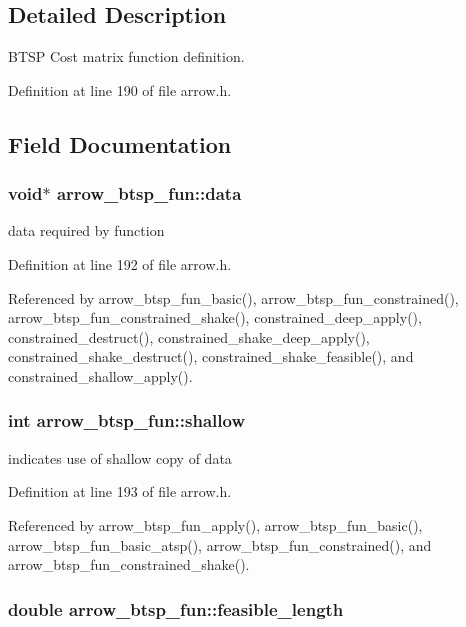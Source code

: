 \subsection{Detailed Description}
BTSP Cost matrix function definition. 

Definition at line 190 of file arrow.h.

\subsection{Field Documentation}
\hypertarget{structarrow__btsp__fun_9c1a276685fb0cac372faef2dd2ba99a}{
\subsubsection{\setlength{\rightskip}{0pt plus 5cm}void$\ast$ {\bf arrow\_\-btsp\_\-fun::data}}}
\label{structarrow__btsp__fun_9c1a276685fb0cac372faef2dd2ba99a}


data required by function 

Definition at line 192 of file arrow.h.

Referenced by arrow\_\-btsp\_\-fun\_\-basic(), arrow\_\-btsp\_\-fun\_\-constrained(), arrow\_\-btsp\_\-fun\_\-constrained\_\-shake(), constrained\_\-deep\_\-apply(), constrained\_\-destruct(), constrained\_\-shake\_\-deep\_\-apply(), constrained\_\-shake\_\-destruct(), constrained\_\-shake\_\-feasible(), and constrained\_\-shallow\_\-apply().\hypertarget{structarrow__btsp__fun_1950686e4862a4b1bd68d1ada85e2c79}{
\subsubsection{\setlength{\rightskip}{0pt plus 5cm}int {\bf arrow\_\-btsp\_\-fun::shallow}}}
\label{structarrow__btsp__fun_1950686e4862a4b1bd68d1ada85e2c79}


indicates use of shallow copy of data 

Definition at line 193 of file arrow.h.

Referenced by arrow\_\-btsp\_\-fun\_\-apply(), arrow\_\-btsp\_\-fun\_\-basic(), arrow\_\-btsp\_\-fun\_\-basic\_\-atsp(), arrow\_\-btsp\_\-fun\_\-constrained(), and arrow\_\-btsp\_\-fun\_\-constrained\_\-shake().\hypertarget{structarrow__btsp__fun_bc871d7af05237e477a340eff4eeda9f}{
\subsubsection{\setlength{\rightskip}{0pt plus 5cm}double {\bf arrow\_\-btsp\_\-fun::feasible\_\-length}}}
\label{structarrow__btsp__fun_bc871d7af05237e477a340eff4eeda9f}


